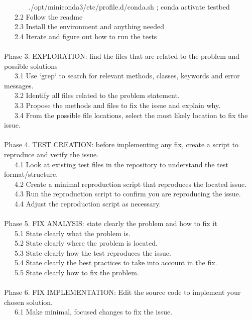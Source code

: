 \begin{tcolorbox}[colback=gray!5!white,colframe=gray!75!black,title=Issue-Solving Prompt,fontupper={\scriptsize\ttfamily\rightskip=0pt plus 1fil},breakable]
~~~~~~~./opt/miniconda3/etc/profile.d/conda.sh ; conda activate testbed\\
~~~2.2 Follow the readme\\
~~~2.3 Install the environment and anything needed\\
~~~2.4 Iterate and figure out how to run the tests\\
\\
Phase 3. EXPLORATION: find the files that are related to the problem and possible solutions\\
~~~3.1 Use `grep` to search for relevant methods, classes, keywords and error messages.\\
~~~3.2 Identify all files related to the problem statement.\\
~~~3.3 Propose the methods and files to fix the issue and explain why.\\
~~~3.4 From the possible file locations, select the most likely location to fix the issue.\\
\\
Phase 4. TEST CREATION: before implementing any fix, create a script to reproduce and verify the issue.\\
~~~4.1 Look at existing test files in the repository to understand the test format/structure.\\
~~~4.2 Create a minimal reproduction script that reproduces the located issue.\\
~~~4.3 Run the reproduction script to confirm you are reproducing the issue.\\
~~~4.4 Adjust the reproduction script as necessary.\\
\\
Phase 5. FIX ANALYSIS: state clearly the problem and how to fix it\\
~~~5.1 State clearly what the problem is.\\
~~~5.2 State clearly where the problem is located.\\
~~~5.3 State clearly how the test reproduces the issue.\\
~~~5.4 State clearly the best practices to take into account in the fix.\\
~~~5.5 State clearly how to fix the problem.\\
\\
Phase 6. FIX IMPLEMENTATION: Edit the source code to implement your chosen solution.\\
~~~6.1 Make minimal, focused changes to fix the issue.\\
\\

\end{tcolorbox}
